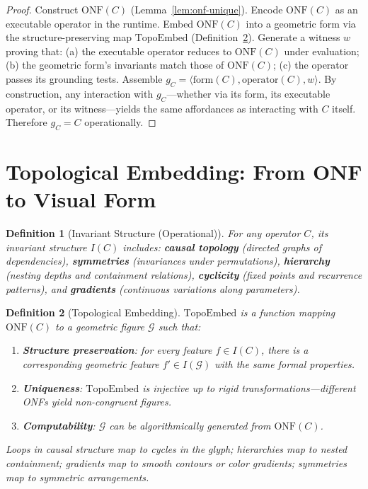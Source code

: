 \documentclass[12pt, letterpaper]{book}
\def\equiv{=}%
\def\mathfrak#1{#1}%
\newtheorem{definition}{Definition}[chapter]
\begin{document}
\begin{proof}
Construct $\mathrm{ONF}(C)$ (Lemma~\ref{lem:onf-unique}). Encode $\mathrm{ONF}(C)$ as an executable operator in the runtime. Embed $\mathrm{ONF}(C)$ into a geometric form via the structure-preserving map $\mathrm{TopoEmbed}$ (Definition~\ref{def:topoembed}). Generate a witness $w$ proving that: (a) the executable operator reduces to $\mathrm{ONF}(C)$ under evaluation; (b) the geometric form's invariants match those of $\mathrm{ONF}(C)$; (c) the operator passes its grounding tests. Assemble $\mathfrak{g}_C = \langle \mathrm{form}(C), \mathrm{operator}(C), w \rangle$. By construction, any interaction with $\mathfrak{g}_C$---whether via its form, its executable operator, or its witness---yields the same affordances as interacting with $C$ itself. Therefore $\mathfrak{g}_C \equiv C$ operationally.
\end{proof}

\section{Topological Embedding: From ONF to Visual Form}

\begin{definition}[Invariant Structure (Operational)]\label{def:inv-op}
For any operator $C$, its invariant structure $I(C)$ includes: \textbf{causal topology} (directed graphs of dependencies), \textbf{symmetries} (invariances under permutations), \textbf{hierarchy} (nesting depths and containment relations), \textbf{cyclicity} (fixed points and recurrence patterns), and \textbf{gradients} (continuous variations along parameters).
\end{definition}

\begin{definition}[Topological Embedding]\label{def:topoembed}
$\mathrm{TopoEmbed}$ is a function mapping $\mathrm{ONF}(C)$ to a geometric figure $\mathcal{G}$ such that:
\begin{enumerate}[label=(\roman*)]
    \item \textbf{Structure preservation}: for every feature $f \in I(C)$, there is a corresponding geometric feature $f' \in I(\mathcal{G})$ with the same formal properties.
    \item \textbf{Uniqueness}: $\mathrm{TopoEmbed}$ is injective up to rigid transformations---different ONFs yield non-congruent figures.
    \item \textbf{Computability}: $\mathcal{G}$ can be algorithmically generated from $\mathrm{ONF}(C)$.
\end{enumerate}
Loops in causal structure map to cycles in the glyph; hierarchies map to nested containment; gradients map to smooth contours or color gradients; symmetries map to symmetric arrangements.
\end{definition}
\end{document}
